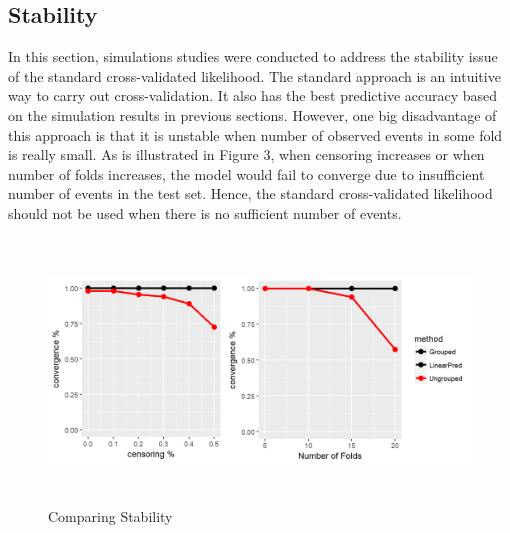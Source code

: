 \subsection {Stability}
  
\par In this section, simulations studies were conducted to address the stability issue of the standard cross-validated likelihood. The standard approach is an intuitive way to carry out cross-validation. It also has the best predictive accuracy based on the simulation results in previous sections. However, one big disadvantage of this approach is that it is unstable when number of observed events in some fold is really small. As is illustrated in Figure 3, when censoring increases or when number of folds increases, the model would fail to converge due to insufficient number of events in the test set. Hence, the standard cross-validated likelihood should not be used when there is no sufficient number of events.

\begin{figure}[h]
    \centering
		\includegraphics[height= 7cm ]{./figures/figure_3.png}
    \caption{Comparing Stability}
\end{figure}	

